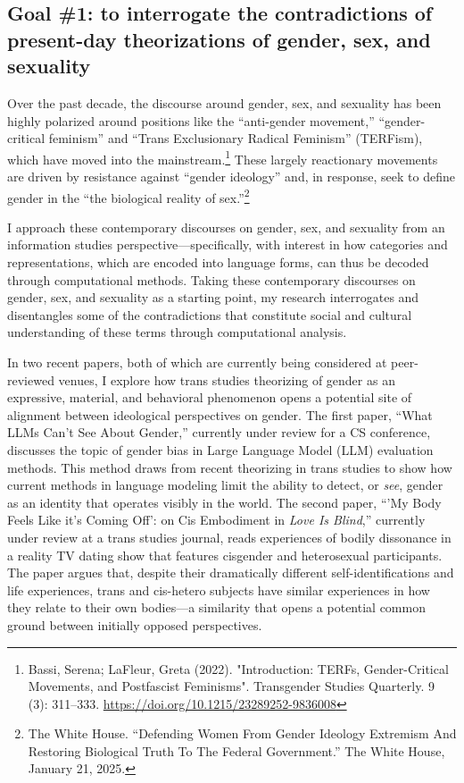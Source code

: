 \documentclass[12pt]{article}
\begin{document}
\subsection*{Goal \#1: to interrogate the contradictions of present-day theorizations of gender, sex, and sexuality}
\label{sec:org910adcd}
Over the past decade, the discourse around gender, sex, and sexuality
has been highly polarized around positions like the ``anti-gender
movement,'' ``gender-critical feminism'' and ``Trans Exclusionary
Radical Feminism'' (TERFism), which have moved into the
mainstream.\footnote{Bassi, Serena; LaFleur, Greta (2022). "Introduction: TERFs,
Gender-Critical Movements, and Postfascist Feminisms". Transgender
Studies Quarterly. 9 (3): 311–333. \url{https://doi.org/10.1215/23289252-9836008}} These largely reactionary movements are driven by
resistance against ``gender ideology'' and, in response, seek to
define gender in the ``the biological reality of sex.''\footnote{The White House. “Defending Women From Gender Ideology
Extremism And Restoring Biological Truth To The Federal Government.”
The White House, January 21, 2025.}

I approach these contemporary discourses on gender, sex, and sexuality
from an information studies perspective---specifically, with interest
in how categories and representations, which are encoded into language
forms, can thus be decoded through computational methods. Taking these
contemporary discourses on gender, sex, and sexuality as a starting
point, my research interrogates and disentangles some of the
contradictions that constitute social and cultural understanding of
these terms through computational analysis.

In two recent papers, both of which are currently being considered at
peer-reviewed venues, I explore how trans studies theorizing of gender
as an expressive, material, and behavioral phenomenon opens a
potential site of alignment between ideological perspectives on
gender. The first paper, ``What LLMs Can't See About Gender,''
currently under review for a CS conference, discusses the topic of
gender bias in Large Language Model (LLM) evaluation methods. This
method draws from recent theorizing in trans studies to show how
current methods in language modeling limit the ability to detect, or
\emph{see}, gender as an identity that operates visibly in the world. The
second paper, ``'My Body Feels Like it’s Coming Off': on Cis
Embodiment in \emph{Love Is Blind},'' currently under review at a trans
studies journal, reads experiences of bodily dissonance in a reality
TV dating show that features cisgender and heterosexual participants.
The paper argues that, despite their dramatically different
self-identifications and life experiences, trans and cis-hetero
subjects have similar experiences in how they relate to their own
bodies---a similarity that opens a potential common ground between
initially opposed perspectives.
\end{document}
